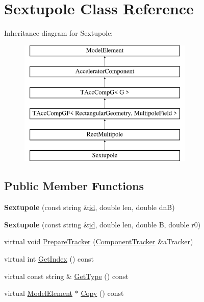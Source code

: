\hypertarget{classSextupole}{}\section{Sextupole Class Reference}
\label{classSextupole}
Inheritance diagram for Sextupole\+:\begin{figure}[H]
\begin{center}
\leavevmode
\includegraphics[height=6.000000cm]{classSextupole}
\end{center}
\end{figure}
\subsection*{Public Member Functions}
\begin{DoxyCompactItemize}
\item 
\mbox{\label{classSextupole_a2cb8d5a43ca7c0e10817a5d274d7c39b}} 
{\bfseries Sextupole} (const string \&\hyperlink{classModelElement_aada171ead2085c75b592cf07d91bc5c2}{id}, double len, double dnB)
\item 
\mbox{\label{classSextupole_a1dcadaaaf587a447d4024db3e7a2a6d5}} 
{\bfseries Sextupole} (const string \&\hyperlink{classModelElement_aada171ead2085c75b592cf07d91bc5c2}{id}, double len, double B, double r0)
\item 
virtual void \hyperlink{classSextupole_a7059ddac1812040330950de346e22f48}{Prepare\+Tracker} (\hyperlink{classComponentTracker}{Component\+Tracker} \&a\+Tracker)
\item 
virtual int \hyperlink{classSextupole_ab86d63dda91c41c870c89069724681a2}{Get\+Index} () const
\item 
virtual const string \& \hyperlink{classSextupole_a7553de8e94eb0567f0e0b4f74183b8f2}{Get\+Type} () const
\item 
virtual \hyperlink{classModelElement}{Model\+Element} $\ast$ \hyperlink{classSextupole_ad2dad4cec1619235b9341c9d8fb855a8}{Copy} () const
\end{DoxyCompactItemize}
